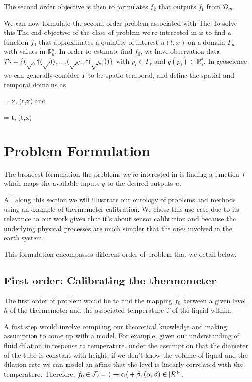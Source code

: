 \begin{bibunit}
{{{{  The second order objective is then to formulates $f_2$ that outputs $f_1$ from  $\cal{D}_1$


  We can now formulate the second order problem associated with 
  The 
   To solve this 
  The end objective of the class of problem we're interested in is to find a function $f_0$  that approximates a quantity of interest $u(t, x)$ on a domain $\Gamma_u$ with values in $\mathbb{R}^d_u$.
  In order to estimate find $f_0$, we have observation data $\cal{D}_0 = \{(p_0, y(p_0)), ..., (p_{N_y}, y(p_{N_y})) \}$ with  $p_i \in \Gamma_y$ and $y(p_i) \in \mathbb{R}^d_y$.
  In geoscience we can generally consider $\Gamma$ to be spatio-temporal, and define the spatial and temporal domains  as {\Omega = {x, (t,x) \in \Gamma} and {\Tau = {t, (t,x) \in \Gamma}
  

\section{Problem Formulation}
\label{sec:chap1_problem_form}



The broadest formulation the problems we're interested in is finding a function $f$ which maps the available inputs $y$ to the desired outputs $u$.





All along this section we will illustrate our ontology of problems and methods using an example of thermometer calibration. We chose this use case due to its relevance to our work given that it's about sensor calibration and because the underlying physical processes are much simpler that the ones involved in the earth system.

This formulation encompasses different order of problem that we detail below.

\subsection{First order: Calibrating the thermometer}
  \label{ssec:firstorder}
The first order of problem would be to find the mapping $f_0$ between a given level $h$ of the thermometer and the associated temperature $T$ of the liquid within.

A first step would involve compiling our theoretical knowledge and making assumption to come up with a model. For example, given our understanding of fluid dilation in response to temperature, under the assumption that the diameter of the tube is constant with height, if we don't know the volume of liquid and the dilation rate we can model an affine  that the level is linearly correlated with the temperature. Therefore, $f_0 \in \cal{F}_0 = { h \to \alpha h + \beta , (\alpha, \beta) \in |R^2 }$.

}}}}}}
\end{bibunit}
